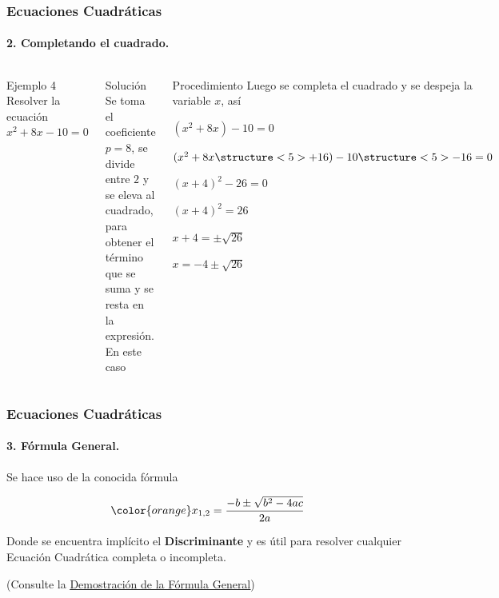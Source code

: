\documentclass[mathserif]{beamer}
\begin{document}
\begin{frame}
\frametitle{\bf Ecuaciones Cuadráticas} 
\framesubtitle{2. Completando el cuadrado.}

    \begin{columns}
        \begin{exampleblock}{Ejemplo 4}
        \bc
        Resolver la ecuación $x^2+8x-10=0$
        \ec
        \end{exampleblock}
\pause
        \begin{block}{Solución}
        Se toma el coeficiente $p=8$, se divide entre $2$ y se eleva al cuadrado, para obtener el término que se suma y se resta en la expresión. En este caso
        \bc
        \ec
        \end{block}
\pause
        \begin{block}{Procedimiento}
        Luego se completa el cuadrado y se des\-peja la variable $x$, así
            \benu
            \item[] <4-| alert@4>$(x^2+8x)-10=0$
            \item[] <5-| alert@5>$(x^2+8x\structure<5>{+16})-10\structure<5>{-16}=0$
            \item[] <6-| alert@6>$(x+4)^2-26=0$
            \item[] <7-| alert@7>$(x+4)^2=26$
            \item[] <8-| alert@8>$x+4=\pm\sqrt{26}$
            \item[] <9-| alert@9>$x=-4\pm\sqrt{26}$
            \eenu
            \pause
        \end{block}
    \end{columns}
\end{frame}

\begin{frame}
\frametitle{\bf Ecuaciones Cuadráticas} 
\framesubtitle{3. Fórmula General.}

Se hace uso de la conocida fórmula \vp 

{\bm $$\color{orange} x_{1,2}=\frac{-b\pm\sqrt{b^2-4ac}}{2a}$$}

\vs Donde se encuentra implícito el {\bf Discriminante} y es útil para resolver cualquier Ecuación Cuadrática completa o incompleta. \vp

\bc
(Consulte la \href{http://matematiquemos.blogspot.com/2016/11/demostracion-de-la-formula-general_48.html}{\color{ZurichBlue}\underline{Demostración de la Fórmula General}})
\ec
\end{frame}
\end{document}
